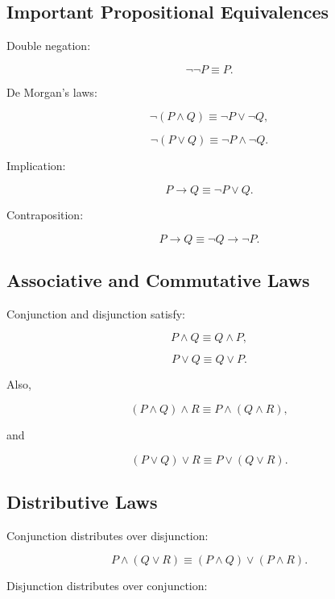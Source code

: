 \subsection{Important Propositional Equivalences}
\label{subsec:propositional-equivalences}

Double negation:

\[
\boxed{
\neg\neg P
\equiv
P.
}
\]

De Morgan's laws:

\[
\boxed{
\neg(P\land Q)
\equiv
\neg P\lor\neg Q,
}
\]

\[
\boxed{
\neg(P\lor Q)
\equiv
\neg P\land\neg Q.
}
\]

Implication:

\[
\boxed{
P\rightarrow Q
\equiv
\neg P\lor Q.
}
\]

Contraposition:

\[
\boxed{
P\rightarrow Q
\equiv
\neg Q\rightarrow\neg P.
}
\]

\subsection{Associative and Commutative Laws}
\label{subsec:logical-associative-commutative}

Conjunction and disjunction satisfy:

\[
\boxed{
P\land Q
\equiv
Q\land P,
}
\]

\[
\boxed{
P\lor Q
\equiv
Q\lor P.
}
\]

Also,

\[
\boxed{
(P\land Q)\land R
\equiv
P\land(Q\land R),
}
\]

and

\[
\boxed{
(P\lor Q)\lor R
\equiv
P\lor(Q\lor R).
}
\]

\subsection{Distributive Laws}
\label{subsec:logical-distributive-laws}

Conjunction distributes over disjunction:

\[
\boxed{
P\land(Q\lor R)
\equiv
(P\land Q)
\lor
(P\land R).
}
\]

Disjunction distributes over conjunction:

